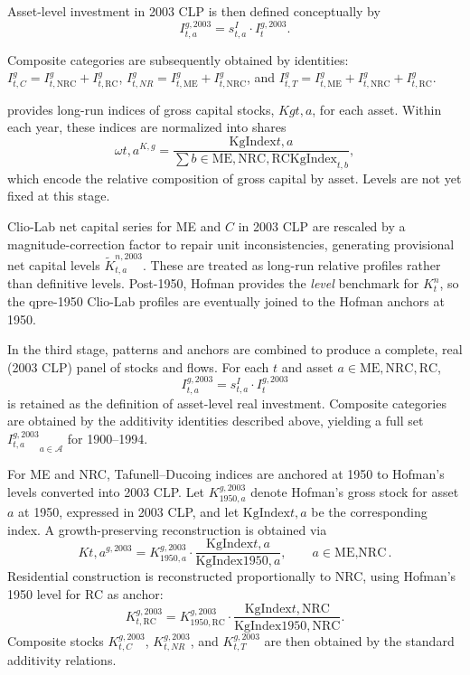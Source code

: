 \documentclass[11pt,a4paper]{article}
\begin{document}
Asset-level investment in 2003 CLP is then defined conceptually by
\begin{equation}
I_{t,a}^{g,2003} = s_{t,a}^{I} \cdot I_{t}^{g,2003}.\end{equation}

Composite categories are subsequently obtained by identities: $I_{t,C}^{g} = I_{t,\text{NRC}}^{g} + I_{t,\text{RC}}^{g}$, $I_{t,NR}^{g} = I_{t,\text{ME}}^{g} + I_{t,\text{NRC}}^{g}$, and $I_{t,T}^{g} = I_{t,\text{ME}}^{g} + I_{t,\text{NRC}}^{g} + I_{t,\text{RC}}^{g}$.

\citet{TafunellDucoing2016} provides long-run indices of gross capital stocks, $Kg{t,a}$, for each asset. Within each year, these indices are normalized into shares\begin{equation}\omega{t,a}^{K,g} = \frac{\text{KgIndex}{t,a}}{\sum{b \in {\text{ME},\text{NRC},\text{RC}}} \text{KgIndex}_{t,b}},\end{equation}which encode the relative composition of gross capital by asset. Levels are not yet fixed at this stage.

Clio-Lab net capital series for ME and $C$ in 2003 CLP are rescaled by a magnitude-correction factor to repair unit inconsistencies, generating provisional net capital levels $\widetilde{K}_{t,a}^{n,2003}$. These are treated as long-run relative profiles rather than definitive levels. Post-1950, Hofman provides the \emph{level} benchmark for $K_t^{n}$, so the qpre-1950 Clio-Lab profiles are eventually joined to the Hofman anchors at 1950.


In the third stage, patterns and anchors are combined to produce a complete, real (2003 CLP) panel of stocks and flows. For each $t$ and asset $a \in {\text{ME},\text{NRC},\text{RC}}$,\begin{equation}I_{t,a}^{g,2003} = s_{t,a}^{I} \cdot I_{t}^{g,2003}\end{equation}is retained as the definition of asset-level real investment. Composite categories are obtained by the additivity identities described above, yielding a full set ${I_{t,a}^{g,2003}}_{a \in \mathcal{A}}$ for 1900--1994.

For ME and NRC, Tafunell--Ducoing indices are anchored at 1950 to Hofman's levels converted into 2003 CLP. Let $K_{1950,a}^{g,2003}$ denote Hofman's gross stock for asset $a$ at 1950, expressed in 2003 CLP, and let $\text{KgIndex}{t,a}$ be the corresponding index. A growth-preserving reconstruction is obtained via\begin{equation}K{t,a}^{g,2003} = K_{1950,a}^{g,2003} \cdot \frac{\text{KgIndex}{t,a}}{\text{KgIndex}{1950,a}},\qquad a \in {\text{ME},\text{NRC}}.\end{equation}Residential construction is reconstructed proportionally to NRC, using Hofman's 1950 level for RC as anchor:\begin{equation}K_{t,\text{RC}}^{g,2003} = K_{1950,\text{RC}}^{g,2003} \cdot \frac{\text{KgIndex}{t,\text{NRC}}}{\text{KgIndex}{1950,\text{NRC}}}.\end{equation}Composite stocks $K_{t,C}^{g,2003}$, $K_{t,NR}^{g,2003}$, and $K_{t,T}^{g,2003}$ are then obtained by the standard additivity relations.
\end{document}
